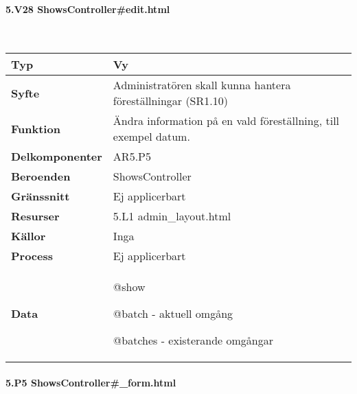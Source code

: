 \documentclass[a4paper, twoside, 11pt, titlepage]{article}
\begin{document}
			\paragraph{5.V28 ShowsController\#edit.html}\

			\begin {table} [ht] \begin{tabular} {  p{3.5cm} p{11.6cm} }
				\hline
				{\sffamily\textbf{Typ}} & {Vy} \\
				\hline
				{\sffamily\textbf{Syfte}} & {Administratören skall kunna hantera föreställningar (SR1.10)} \\
				\hline
				{\sffamily\textbf{Funktion}} & {Ändra information på en vald föreställning, till exempel datum.} \\
				\hline
				{\sffamily\textbf{Delkomponenter}} & {AR5.P5} \\
				\hline
				{\sffamily\textbf{Beroenden}} & {ShowsController} \\
				\hline
				{\sffamily\textbf{Gränssnitt}} & {Ej applicerbart} \\
				\hline
				{\sffamily\textbf{Resurser}} & {5.L1 admin\_layout.html} \\
				\hline
				{\sffamily\textbf{Källor}} & {Inga} \\
				\hline
				{\sffamily\textbf{Process}} & {Ej applicerbart} \\
				\hline
				{\sffamily\textbf{Data}} & {@show

@batch - aktuell omgång

@batches - existerande omgångar} \\
				\hline
			\end{tabular} \end{table} \FloatBarrier


			\clearpage %
			\paragraph{5.P5 ShowsController\#\_form.html}\
\end{document}
